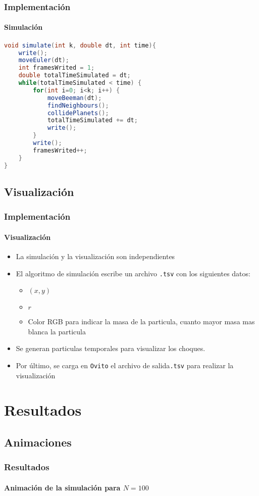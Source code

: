 \documentclass[hyperref={pdfpagelayout=SinglePage}]{beamer}
\begin{document}
\begin{frame}[fragile]
\frametitle{Implementación}
\framesubtitle{Simulación}
\begin{lstlisting}[language=Java, caption = Simulación]
void simulate(int k, double dt, int time){
	write();
	moveEuler(dt);
	int framesWrited = 1;
	double totalTimeSimulated = dt;
	while(totalTimeSimulated < time) {
 		for(int i=0; i<k; i++) {
			moveBeeman(dt);
			findNeighbours();
			collidePlanets();
            totalTimeSimulated += dt;
			write();
		}
		write();
		framesWrited++;
    }
}
\end{lstlisting}
\end{frame}

\subsection{Visualización}

\begin{frame}
\frametitle{Implementación}
\framesubtitle{Visualización}
\begin{itemize}
	\item La simulación y la visualización son independientes
	\item El algoritmo de simulación escribe un archivo \texttt{.tsv} con los siguientes datos:
\begin{itemize}
\item $(x,y)$
\item $r$
\item Color RGB para indicar la masa de la particula, cuanto mayor masa mas blanca la particula\end{itemize}
\item Se generan particulas temporales para visualizar los choques.
\item Por último, se carga en \texttt{Ovito} el archivo de salida\texttt{.tsv} para realizar la visualización
\end{itemize}
\end{frame}


\section{Resultados}

\subsection{Animaciones}

\begin{frame}
\frametitle{Resultados}
\framesubtitle{Animación de la simulación para $N = 100$}
\begin{figure}[H]
	\centering
\end{figure}
\end{frame}
\end{document}
